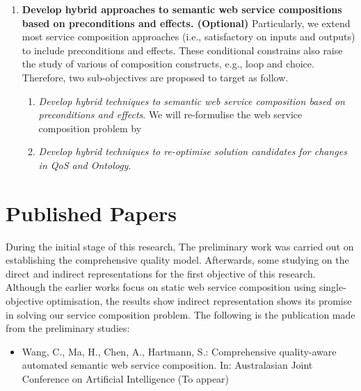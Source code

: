 \begin{enumerate}
\begin{enumerate}
 \end{enumerate}
 
 
 
 
 \item \textbf{Develop hybrid approaches to semantic web service compositions based on preconditions and effects. (Optional)} Particularly, we extend most service composition approaches (i.e., satisfactory on inputs and outputs) to include preconditions and effects. These conditional constrains also raise the study of various of composition constructs, e.g., loop and choice. Therefore, two sub-objectives are proposed to target as follow.
 \begin{enumerate}
 
  \item \emph{Develop hybrid techniques to semantic web service composition based on preconditions and effects}. We will re-formulise the web service composition problem by  
   \item \emph{Develop hybrid techniques to re-optimise solution candidates for changes in QoS and Ontology}. 

 
 \end{enumerate}
 
\end{enumerate}

\section{Published Papers}

During the initial stage of this research, The preliminary work was carried out on establishing the comprehensive quality model.  Afterwards, some studying on the direct and indirect representations for the first objective of this research. Although the earlier works focus on static web service composition using single-objective optimisation, the results show indirect representation shows its promise in solving our service composition problem.  The following is the publication made from the preliminary studies:

\begin{itemize}
 \item Wang, C., Ma, H., Chen, A., Hartmann, S.: Comprehensive quality-aware automated semantic web service composition. In: Australasian Joint Conference on Artificial Intelligence (To appear)
\end{itemize}


